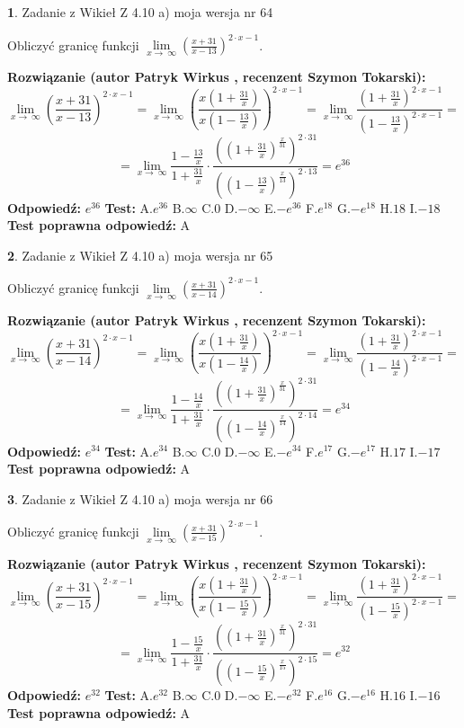 \documentclass[12pt, a4paper]{article}
\theoremstyle{definition} %
\newtheorem{zad}{}
\newcommand{\zadStart}[1]{\begin{zad}#1\newline}
\newcommand{\zadStop}{\end{zad}}
\newcommand{\rozwStart}[2]{\noindent \textbf{Rozwiązanie (autor #1 , recenzent #2): }\newline}
\newcommand{\rozwStop}{\newline}
\newcommand{\odpStart}{\noindent \textbf{Odpowiedź:}\newline}
\newcommand{\odpStop}{\newline}
\newcommand{\testStart}{\noindent \textbf{Test:}\newline}
\newcommand{\testStop}{\newline}
\newcommand{\kluczStart}{\noindent \textbf{Test poprawna odpowiedź:}\newline}
\newcommand{\kluczStop}{\newline}
\begin{document}
\zadStart{Zadanie z Wikieł Z 4.10 a) moja wersja nr 64}

Obliczyć granicę funkcji  $\lim\limits_{x\to\ \infty}(\frac{x+31}{x-13})^{2\cdot x-1}$.
\zadStop
\rozwStart{Patryk Wirkus}{Szymon Tokarski}
$$\lim\limits_{x\to\ \infty}(\frac{x+31}{x-13})^{2\cdot x-1} = \lim\limits_{x\to\ \infty}(\frac{x(1+\frac{31}{x})}{x(1-\frac{13}{x})})^{2\cdot x-1}=\lim\limits_{x\to\ \infty}\frac{(1+\frac{31}{x})^{2\cdot x-1}}{(1-\frac{13}{x})^{2\cdot x-1}}=$$
$$=\lim\limits_{x\to\ \infty}\frac{1-\frac{13}{x}}{1+\frac{31}{x}}\cdot\frac{((1+\frac{31}{x})^{\frac{x}{31}})^{2\cdot31}}{((1-\frac{13}{x})^{\frac{x}{13}})^{2\cdot13}}=e^{36}$$
\rozwStop
\odpStart
$e^{36}$
\odpStop
\testStart
A.$e^{36}$ B.$\infty$ C.$0$ D.$-\infty$ E.$-e^{36}$
F.$e^{18}$ G.$-e^{18}$
H.$18$
I.$-18$
\testStop
\kluczStart
A
\kluczStop



\zadStart{Zadanie z Wikieł Z 4.10 a) moja wersja nr 65}

Obliczyć granicę funkcji  $\lim\limits_{x\to\ \infty}(\frac{x+31}{x-14})^{2\cdot x-1}$.
\zadStop
\rozwStart{Patryk Wirkus}{Szymon Tokarski}
$$\lim\limits_{x\to\ \infty}(\frac{x+31}{x-14})^{2\cdot x-1} = \lim\limits_{x\to\ \infty}(\frac{x(1+\frac{31}{x})}{x(1-\frac{14}{x})})^{2\cdot x-1}=\lim\limits_{x\to\ \infty}\frac{(1+\frac{31}{x})^{2\cdot x-1}}{(1-\frac{14}{x})^{2\cdot x-1}}=$$
$$=\lim\limits_{x\to\ \infty}\frac{1-\frac{14}{x}}{1+\frac{31}{x}}\cdot\frac{((1+\frac{31}{x})^{\frac{x}{31}})^{2\cdot31}}{((1-\frac{14}{x})^{\frac{x}{14}})^{2\cdot14}}=e^{34}$$
\rozwStop
\odpStart
$e^{34}$
\odpStop
\testStart
A.$e^{34}$ B.$\infty$ C.$0$ D.$-\infty$ E.$-e^{34}$
F.$e^{17}$ G.$-e^{17}$
H.$17$
I.$-17$
\testStop
\kluczStart
A
\kluczStop



\zadStart{Zadanie z Wikieł Z 4.10 a) moja wersja nr 66}

Obliczyć granicę funkcji  $\lim\limits_{x\to\ \infty}(\frac{x+31}{x-15})^{2\cdot x-1}$.
\zadStop
\rozwStart{Patryk Wirkus}{Szymon Tokarski}
$$\lim\limits_{x\to\ \infty}(\frac{x+31}{x-15})^{2\cdot x-1} = \lim\limits_{x\to\ \infty}(\frac{x(1+\frac{31}{x})}{x(1-\frac{15}{x})})^{2\cdot x-1}=\lim\limits_{x\to\ \infty}\frac{(1+\frac{31}{x})^{2\cdot x-1}}{(1-\frac{15}{x})^{2\cdot x-1}}=$$
$$=\lim\limits_{x\to\ \infty}\frac{1-\frac{15}{x}}{1+\frac{31}{x}}\cdot\frac{((1+\frac{31}{x})^{\frac{x}{31}})^{2\cdot31}}{((1-\frac{15}{x})^{\frac{x}{15}})^{2\cdot15}}=e^{32}$$
\rozwStop
\odpStart
$e^{32}$
\odpStop
\testStart
A.$e^{32}$ B.$\infty$ C.$0$ D.$-\infty$ E.$-e^{32}$
F.$e^{16}$ G.$-e^{16}$
H.$16$
I.$-16$
\testStop
\kluczStart
A
\kluczStop
\end{document}
